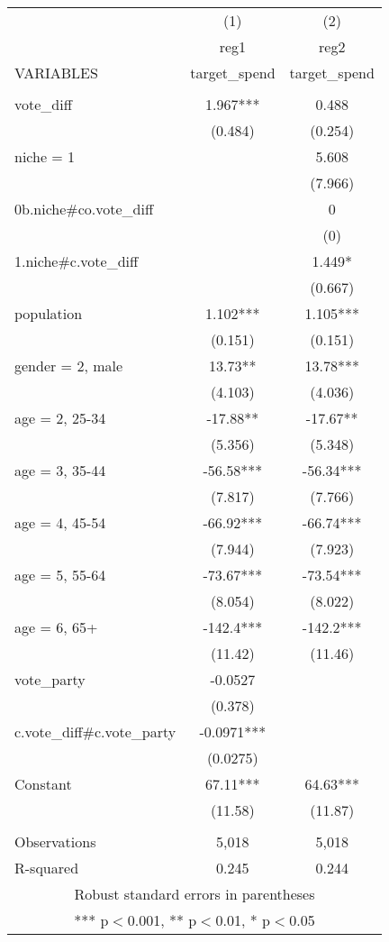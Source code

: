 \documentclass[]{article}
\begin{document}
\begin{tabular}{lcc} \hline
 & (1) & (2) \\
 & reg1 & reg2 \\
VARIABLES & target\_spend & target\_spend \\ \hline
 &  &  \\
vote\_diff & 1.967*** & 0.488 \\
 & (0.484) & (0.254) \\
niche = 1 &  & 5.608 \\
 &  & (7.966) \\
0b.niche\#co.vote\_diff &  & 0 \\
 &  & (0) \\
1.niche\#c.vote\_diff &  & 1.449* \\
 &  & (0.667) \\
population & 1.102*** & 1.105*** \\
 & (0.151) & (0.151) \\
gender = 2, male & 13.73** & 13.78*** \\
 & (4.103) & (4.036) \\
age = 2, 25-34 & -17.88** & -17.67** \\
 & (5.356) & (5.348) \\
age = 3, 35-44 & -56.58*** & -56.34*** \\
 & (7.817) & (7.766) \\
age = 4, 45-54 & -66.92*** & -66.74*** \\
 & (7.944) & (7.923) \\
age = 5, 55-64 & -73.67*** & -73.54*** \\
 & (8.054) & (8.022) \\
age = 6, 65+ & -142.4*** & -142.2*** \\
 & (11.42) & (11.46) \\
vote\_party & -0.0527 &  \\
 & (0.378) &  \\
c.vote\_diff\#c.vote\_party & -0.0971*** &  \\
 & (0.0275) &  \\
Constant & 67.11*** & 64.63*** \\
 & (11.58) & (11.87) \\
 &  &  \\
Observations & 5,018 & 5,018 \\
 R-squared & 0.245 & 0.244 \\ \hline
\multicolumn{3}{c}{ Robust standard errors in parentheses} \\
\multicolumn{3}{c}{ *** p$<$0.001, ** p$<$0.01, * p$<$0.05} \\
\end{tabular}
\end{document}
